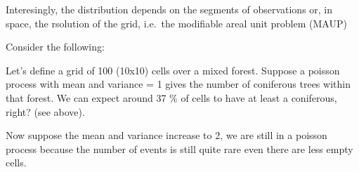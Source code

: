 \documentclass[
  letterpaper,
  DIV=11,
  numbers=noendperiod]{scrreprt}
\newenvironment{Shaded}{\begin{snugshade}}{\end{snugshade}}
\newcommand{\AttributeTok}[1]{\textcolor[rgb]{0.40,0.45,0.13}{#1}}
\newcommand{\CommentTok}[1]{\textcolor[rgb]{0.37,0.37,0.37}{#1}}
\newcommand{\DecValTok}[1]{\textcolor[rgb]{0.68,0.00,0.00}{#1}}
\newcommand{\FloatTok}[1]{\textcolor[rgb]{0.68,0.00,0.00}{#1}}
\newcommand{\FunctionTok}[1]{\textcolor[rgb]{0.28,0.35,0.67}{#1}}
\newcommand{\NormalTok}[1]{\textcolor[rgb]{0.00,0.23,0.31}{#1}}
\newcommand{\OtherTok}[1]{\textcolor[rgb]{0.00,0.23,0.31}{#1}}
\newcommand{\SpecialCharTok}[1]{\textcolor[rgb]{0.37,0.37,0.37}{#1}}
\begin{document}
\begin{Shaded}
\end{Shaded}

Interesingly, the distribution depends on the segments of observations
or, in space, the rsolution of the grid, i.e.~the modifiable areal unit
problem (MAUP)

Consider the following:

Let's define a grid of 100 (10x10) cells over a mixed forest. Suppose a
poisson process with mean and variance = 1 gives the number of
coniferous trees within that forest. We can expect around 37 \% of cells
to have at least a coniferous, right? (see above).

Now suppose the mean and variance increase to 2, we are still in a
poisson process because the number of events is still quite rare even
there are less empty cells.
\end{document}

